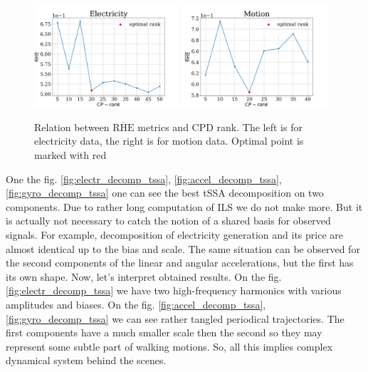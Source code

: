 \documentclass[referee, pdflatex, sn-mathphys-num]{sn-jnl}
\theoremstyle{definition}
\theoremstyle{plain}
\begin{document}
	\begin{figure}[h]
		\centering
		\includegraphics[width=0.48\textwidth, keepaspectratio]{RHE_mean_elec.png}
		\includegraphics[width=0.48\textwidth, keepaspectratio]{RHE_mean_motion.png}
		\caption{Relation between $ \overline{\text{RHE}} $ metrics and CPD rank. The left is for electricity data, the right is for motion data. Optimal point is marked with red}\label{fig:decomp_rhe_rank}
	\end{figure}
	
	One the fig. \ref{fig:electr_decomp_tssa}, \ref{fig:accel_decomp_tssa}, \ref{fig:gyro_decomp_tssa} one can see the best tSSA decomposition on two components. Due to rather long computation of ILS we do not make more. But it is actually not necessary to catch the notion of a shared basis for observed signals. For example, decomposition of electricity generation and its price are almost identical up to the bias and scale. The same situation can be observed for the second components of the linear and angular accelerations, but the first has its own shape. Now, let's interpret obtained results. On the fig. \ref{fig:electr_decomp_tssa} we have two high-frequency harmonics with various amplitudes and biases. On the fig. \ref{fig:accel_decomp_tssa}, \ref{fig:gyro_decomp_tssa} we can see rather tangled periodical trajectories. The first components have a much smaller scale then the second so they may represent some subtle part of walking motions. So, all this implies complex dynamical system behind the scenes.
	
\end{document}
